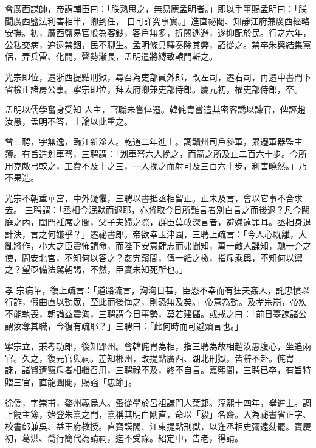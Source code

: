 \begin{pinyinscope}
 會廣西謀帥，帝謂輔臣曰：「朕熟思之，無易應孟明者。」即以手筆賜孟明曰：「朕聞廣西鹽法利害相半，卿到任，
 自可詳究事實。」進直祕閣、知靜江府兼廣西經略安撫。初，廣西鹽易官般為客鈔，客戶無多，折閱逃避，遂抑配於民。行之六年，公私交病，追逮禁錮，民不聊生。孟明條具驛奏除其弊，詔從之。禁卒朱興結集黨侶，弄兵雷、化間，聲勢漸長，孟明遣將縛致轅門斬之。



 光宗即位，遷浙西提點刑獄，尋召為吏部員外郎，改左司，遷右司，再遷中書門下省檢正諸房公事。寧宗即位，拜太府卿兼吏部侍郎。慶元初，權吏部侍郎，卒。



 孟明以儒學奮身受知
 人主，官職未嘗倖遷。韓侂胄嘗遣其密客誘以諫官，俾誣趙汝愚，孟明不答，士論以此重之。



 曾三聘，字無逸，臨江新淦人。乾道二年進士。調贛州司戶參軍，累遷軍器監主簿。有旨造划車弩，三聘謂：「划車弩六人挽之，而箭之所及止二百六十步。今所用克敵弓較之，工費不及十之三，一人挽之而射可及三百六十步，利害曉然。」乃不果造。



 光宗不朝重華宮，中外疑懼，三聘以書抵丞相留正。正未及言，會以它事不合求去。
 三聘謂：「丞相今泯默而退耶，亦將取今日所難言者別白言之而後退？凡今闕庭之內，閨門衽席之間，父子夫婦之際，群臣莫敢深言者，避嫌遠罪耳。丞相身退計決，言之何嫌乎？」遷祕書郎。帝欲幸玉津園，三聘上疏言：「今人心既離，大亂將作，小大之臣震怖請命，而陛下安意肆志而弗聞知，萬一敵人諜知，馳一介之使，問安北宮，不知何以答之？姦宄窺間，傳一紙之檄，指斥乘輿，不知何以禦之？望亟備法駕朝謁，不然，臣實未知死所也。」



 孝
 宗病革，復上疏言：「道路流言，洶洶日甚，臣恐不幸而有狂夫姦人，託忠憤以行詐，假曲直以動眾，至此而後悔之，則恐無及矣。」帝意為動。及孝宗崩，帝疾不能執喪，朝論益震洶，三聘謂今日事勢，莫若建儲。或戒之曰：「前日臺諫諸公謂汝奪其職，今復有疏耶？」三聘曰：「此何時而可避煩言也。」



 寧宗立，兼考功郎，後知郢州。會韓侂胄為相，指三聘為故相趙汝愚腹心，坐追兩官。久之，復元官與祠。差知郴州，改提點廣西、湖北刑獄，皆辭不赴。侂胄
 誅，諸賢遭竄斥者相繼召用，三聘祿不及，終不自言。嘉熙間，三聘已卒，有旨特贈三官，直龍圖閣，賜謚「忠節」。



 徐僑，字崇甫，婺州義烏人。蚤從學於呂祖謙門人葉邽。淳熙十四年，舉進士。調上饒主簿，始登朱熹之門，熹稱其明白剛直，命以「毅」名齋。入為祕書省正字、校書郎兼吳、益王府教授。直寶謨閣、江東提點刑獄，以迕丞相史彌遠劾罷。寶慶初，葛洪、喬行簡代為請祠，迄不受祿。紹定中，告老，得請。




\end{pinyinscope}
